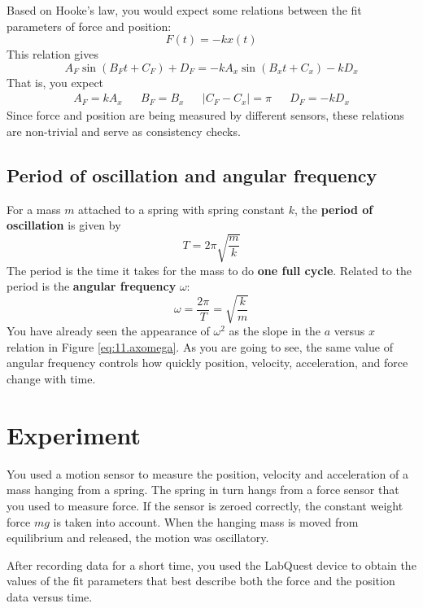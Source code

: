 Based on Hooke's law, you would expect some relations between the fit parameters of force and position:
\begin{equation}
    F(t) = - k x(t)
\end{equation}
This relation gives
\begin{equation}
    A_{F} \sin\left(B_{F} t + C_{F}\right) + D_{F} = -k A_{x} \sin\left( B_{x}t + C_{x} \right) - kD_{x}
\end{equation}
That is, you expect
\begin{align}
    A_{F} = kA_{x} && B_{F} = B_{x} && \vert C_{F} - C_{x} \vert = \pi && D_{F} = -kD_{x}
\end{align}
Since force and position are being measured by different sensors, these relations are non-trivial and serve as consistency checks.
%
\subsection{Period of oscillation and angular frequency}
%
For a mass $m$ attached to a spring with spring constant $k$, the \textbf{period of oscillation} is given by
\begin{equation}
    T = 2\pi \sqrt{\frac{m}{k}}
\end{equation}
The period is the time it takes for the mass to do \textbf{one full cycle}. Related to the period is the \textbf{angular frequency} $\omega$:
\begin{equation}
    \omega = \frac{2 \pi}{T} = \sqrt{\frac{k}{m}}
    \label{eq.11.omega}
\end{equation}
You have already seen the appearance of $\omega^{2}$ as the slope in the $a$ versus $x$ relation in Figure \ref{eq:11.axomega}. As you are going to see, the same value of angular frequency controls how quickly position, velocity, acceleration, and force change with time.
%
\section{Experiment}
%
You used a motion sensor to measure the position, velocity and acceleration of a mass hanging from a spring. The spring in turn hangs from a force sensor that you used to measure force. If the sensor is zeroed correctly, the constant weight force $mg$ is taken into account. When the hanging mass is moved from equilibrium and released, the motion was oscillatory.

After recording data for a short time, you used the LabQuest device to obtain the values of the fit parameters that best describe both the force and the position data versus time.

